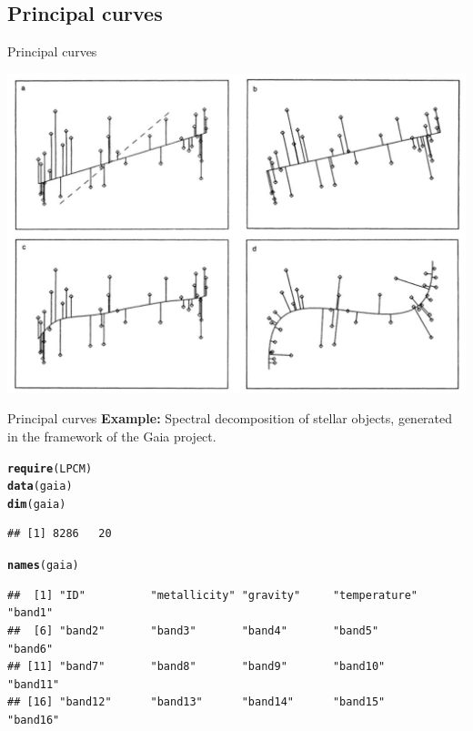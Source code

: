 \documentclass[10pt,xcolor=dvipsnames]{beamer}\usepackage[]{graphicx}\usepackage[]{color}
\makeatletter
\newcommand{\hlstd}[1]{\textcolor[rgb]{0.345,0.345,0.345}{#1}}%
\newcommand{\hlkwd}[1]{\textcolor[rgb]{0.737,0.353,0.396}{\textbf{#1}}}%
\newenvironment{kframe}{%
 \def\at@end@of@kframe{}%
 \ifinner\ifhmode%
  \def\at@end@of@kframe{\end{minipage}}%
  \begin{minipage}{\columnwidth}%
 \fi\fi%
 \def\FrameCommand##1{\hskip\@totalleftmargin \hskip-\fboxsep
 \colorbox{shadecolor}{##1}\hskip-\fboxsep
     \hskip-\linewidth \hskip-\@totalleftmargin \hskip\columnwidth}%
 \MakeFramed {\advance\hsize-\width
   \@totalleftmargin\z@ \linewidth\hsize
   \@setminipage}}%
 {\par\unskip\endMakeFramed%
 \at@end@of@kframe}
\newenvironment{knitrout}{}{} %
\makeatother
\begin{document}
\subsection{Principal curves}


\begin{frame}{Principal curves}

 \includegraphics{figures/pcurve.jpg}
 
\end{frame}


\begin{frame}{Principal curves}
\noindent \textbf{Example:}  Spectral decomposition of stellar objects, generated in the framework of the Gaia project.
\begin{knitrout}\footnotesize
{}\color{fgcolor}\begin{kframe}
\begin{alltt}
\hlkwd{require}\hlstd{(LPCM)}
\hlkwd{data}\hlstd{(gaia)}
\hlkwd{dim}\hlstd{(gaia)}
\end{alltt}
\begin{verbatim}
## [1] 8286   20
\end{verbatim}
\begin{alltt}
\hlkwd{names}\hlstd{(gaia)}
\end{alltt}
\begin{verbatim}
##  [1] "ID"          "metallicity" "gravity"     "temperature" "band1"      
##  [6] "band2"       "band3"       "band4"       "band5"       "band6"      
## [11] "band7"       "band8"       "band9"       "band10"      "band11"     
## [16] "band12"      "band13"      "band14"      "band15"      "band16"
\end{verbatim}
\end{kframe}
\end{knitrout}
\end{frame}
\end{document}
